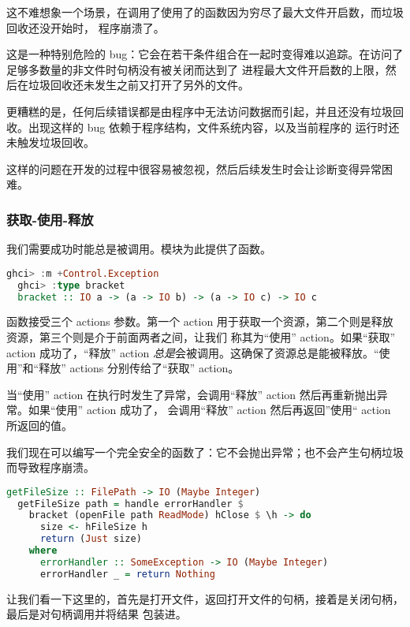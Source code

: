 \documentclass[./main.tex]{subfiles}
\begin{document}
这不难想象一个场景，在调用了使用了的函数因为穷尽了最大文件开启数，而垃圾回收还没开始时，
程序崩溃了。

这是一种特别危险的 bug：它会在若干条件组合在一起时变得难以追踪。在访问了足够多数量的非文件时句柄没有被关闭而达到了
进程最大文件开启数的上限，然后在垃圾回收还未发生之前又打开了另外的文件。

更糟糕的是，任何后续错误都是由程序中无法访问数据而引起，并且还没有垃圾回收。出现这样的 bug 依赖于程序结构，文件系统内容，以及当前程序的
运行时还未触发垃圾回收。

这样的问题在开发的过程中很容易被忽视，然后后续发生时会让诊断变得异常困难。

\subsubsection*{获取-使用-释放}

我们需要成功时能总是被调用。模块为此提供了函数。

\begin{lstlisting}[language=Haskell]
  ghci> :m +Control.Exception
  ghci> :type bracket
  bracket :: IO a -> (a -> IO b) -> (a -> IO c) -> IO c
\end{lstlisting}

函数接受三个 actions 参数。第一个 action 用于获取一个资源，第二个则是释放资源，第三个则是介于前面两者之间，让我们
称其为“使用” action。如果“获取” action 成功了，“释放” action \textit{总是}会被调用。这确保了资源总是能被释放。“使用”和“释放”
actions 分别传给了“获取” action。

当“使用” action 在执行时发生了异常，会调用“释放” action 然后再重新抛出异常。如果“使用” action 成功了，
会调用“释放” action 然后再返回”使用“ action 所返回的值。

我们现在可以编写一个完全安全的函数了：它不会抛出异常；也不会产生句柄垃圾而导致程序崩溃。

\begin{lstlisting}[language=Haskell]
  getFileSize :: FilePath -> IO (Maybe Integer)
  getFileSize path = handle errorHandler $
    bracket (openFile path ReadMode) hClose $ \h -> do
      size <- hFileSize h
      return (Just size)
    where
      errorHandler :: SomeException -> IO (Maybe Integer)
      errorHandler _ = return Nothing
\end{lstlisting}

让我们看一下这里的，首先是打开文件，返回打开文件的句柄，接着是关闭句柄，最后是对句柄调用并将结果
包装进。
\end{document}
